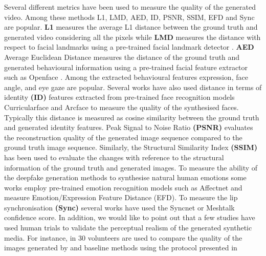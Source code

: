 Several different metrics have been used to measure the quality of the generated video. Among these methods L1, LMD, AED, ID, PSNR, SSIM, EFD and Sync are popular. \textbf{L1} measures the average L1 distance between the ground truth and generated video considering all the pixels while \textbf{LMD} measures the distance with respect to facial landmarks using a pre-trained facial landmark detector \cite{siarohin2019first}. \textbf{AED}  Average Euclidean Distance measures the distance of the ground truth and generated behavioural information using a pre-trained facial feature extractor such as Openface \cite{amos2016openface}. Among the extracted behavioural features expression, face angle, and eye gaze are popular. Several works have also used distance in terms of identity \textbf{(ID)} features extracted from pre-trained face recognition models Curricularface \cite{huang2020curricularface} and Arcface \cite{deng2019arcface} to measure the quality of the synthesised faces. Typically this distance is measured as cosine similarity between the ground truth and generated identity features. Peak Signal to Noise Ratio \textbf{(PSNR)} evaluates the reconstruction quality of the generated image sequence compared to the ground truth image sequence. Similarly, the Structural Similarity Index 
 \textbf{(SSIM)} has been used to evaluate the changes with reference to the structural information of the ground truth and generated images. To measure the ability of the deepfake generation methods to synthesise natural human emotions some works \cite{xu2023multimodal, goyal2023emotionally} employ pre-trained emotion recognition models such as Affectnet \cite{mollahosseini2017affectnet} and measure Emotion/Expression Feature Distance (EFD). To measure the lip synchronisation \textbf{(Sync)} several works \cite{fan2022faceformer, xu2023multimodal, jang2023s} have used the Syncnet \cite{chung2017out} or Meshtalk \cite{richard2021meshtalk} confidence score. In addition, we would like to point out that a few studies have used human trials to validate the perceptual realism of the generated synthetic media. For instance, in \cite{wu2018reenactgan} 30 volunteers are used to compare the quality of the images generated by \cite{wu2018reenactgan} and baseline methods using the protocol presented in \cite{isola2017image}

